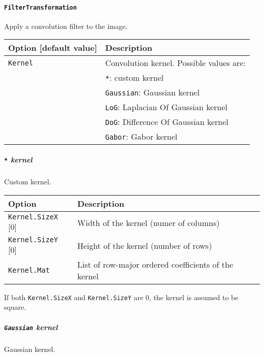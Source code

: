 \documentclass[a4paper,11pt,oneside]{article}
\begin{document}
\paragraph{\texorpdfstring{%
\lstinline[basicstyle=\ttfamily\bfseries]!FilterTransformation!}
{FilterTransformation}}
Apply a convolution filter to the image.

\begin{center}
 \begin{tabular}{| p{5cm} | p{10cm} | }
 \hline
 Option [default value] & Description\\
 \hline\hline
  \cellcolor{requiredcolor}\lstinline!Kernel! & Convolution kernel.
  Possible values are: \\
   & \lstinline!*!: custom kernel \\
   & \lstinline!Gaussian!: Gaussian kernel \\
   & \lstinline!LoG!: Laplacian Of Gaussian kernel \\
   & \lstinline!DoG!: Difference Of Gaussian kernel \\
   & \lstinline!Gabor!: Gabor kernel \\
 \hline
\end{tabular}
\end{center}


\subparagraph{\texorpdfstring{%
\lstinline[basicstyle=\ttfamily\bfseries]!*! kernel}{* kernel}}
Custom kernel.

\begin{center}
 \begin{tabular}{| m{4cm} | m{7cm} | }
 \hline
 Option & Description\\
 \hline\hline
  \lstinline!Kernel.SizeX! [0] & Width of the kernel (numer of columns)\\
  \lstinline!Kernel.SizeY! [0] & Height of the kernel (number of rows)\\
  \cellcolor{requiredcolor}\lstinline!Kernel.Mat! & List of row-major ordered
   coefficients of the kernel\\
 \hline
\end{tabular}
\end{center}

If both \lstinline!Kernel.SizeX! and \lstinline!Kernel.SizeY! are 0, the kernel
 is assumed to be square.


\subparagraph{\texorpdfstring{%
\lstinline[basicstyle=\ttfamily\bfseries]!Gaussian! kernel}{Gaussian kernel}}
Gaussian kernel.
\end{document}
